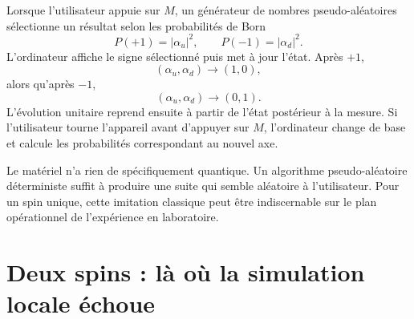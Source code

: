 Lorsque l’utilisateur appuie sur \(M\), un générateur de nombres pseudo-aléatoires sélectionne un résultat selon les probabilités de Born
\begin{equation}
P(+1)=|\alpha_u|^2,
\qquad
P(-1)=|\alpha_d|^2.
\label{eq:l8-one-spin-born}
\end{equation}
L’ordinateur affiche le signe sélectionné puis met à jour l’état. Après \(+1\),
\begin{equation}
(\alpha_u,\alpha_d)\longrightarrow(1,0),
\end{equation}
alors qu’après \(-1\),
\begin{equation}
(\alpha_u,\alpha_d)\longrightarrow(0,1).
\end{equation}
L’évolution unitaire reprend ensuite à partir de l’état postérieur à la mesure. Si l’utilisateur tourne l’appareil avant d’appuyer sur \(M\), l’ordinateur change de base et calcule les probabilités correspondant au nouvel axe.

Le matériel n’a rien de spécifiquement quantique. Un algorithme pseudo-aléatoire déterministe suffit à produire une suite qui semble aléatoire à l’utilisateur. Pour un spin unique, cette imitation classique peut être indiscernable sur le plan opérationnel de l’expérience en laboratoire.

\begin{classroomqa}
\end{classroomqa}

\begin{classroomqa}
\end{classroomqa}

\section{Deux spins : là où la simulation locale échoue}

